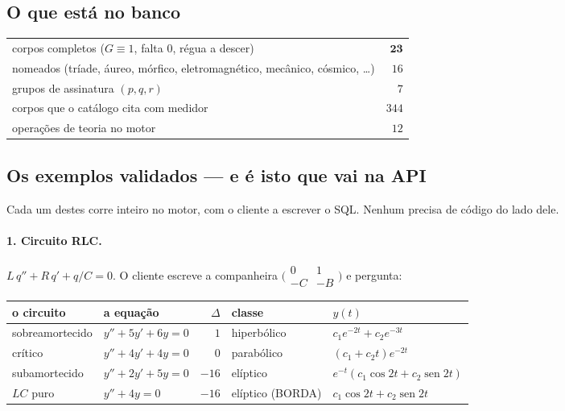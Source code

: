 \documentclass[11pt,a4paper]{article}
\begin{document}
\subsection*{O que está no banco}

\begin{center}\small
\begin{tabular}{@{}lr@{}}
\toprule
corpos completos ($G\equiv1$, falta $0$, régua a descer) & $\mathbf{23}$\\
\quad nomeados (tríade, áureo, mórfico, eletromagnético, mecânico, cósmico, …) & $16$\\
\quad grupos de assinatura $(p,q,r)$ & $7$\\
\midrule
corpos que o catálogo cita com medidor & $344$\\
operações de teoria no motor & $12$\\
\bottomrule
\end{tabular}
\end{center}

\subsection*{Os exemplos validados --- e é isto que vai na API}

\noindent Cada um destes corre inteiro no motor, com o cliente a escrever o SQL. Nenhum
precisa de código do lado dele.

\paragraph{1. Circuito RLC.} $L\,q''+R\,q'+q/C=0$. O cliente escreve a companheira
$\bigl(\begin{smallmatrix}0&1\\-C&-B\end{smallmatrix}\bigr)$ e pergunta:
\begin{center}\footnotesize
\begin{tabular}{@{}llrll@{}}
\toprule
o circuito & a equação & $\Delta$ & classe & $y(t)$\\
\midrule
sobreamortecido & $y''+5y'+6y=0$ & $1$ & hiperbólico & $c_1e^{-2t}+c_2e^{-3t}$\\
crítico & $y''+4y'+4y=0$ & $0$ & parabólico & $(c_1+c_2t)e^{-2t}$\\
subamortecido & $y''+2y'+5y=0$ & $-16$ & elíptico & $e^{-t}(c_1\cos2t+c_2\operatorname{sen}2t)$\\
$LC$ puro & $y''+4y=0$ & $-16$ & elíptico (BORDA) & $c_1\cos2t+c_2\operatorname{sen}2t$\\
\bottomrule
\end{tabular}
\end{center}
\end{document}
